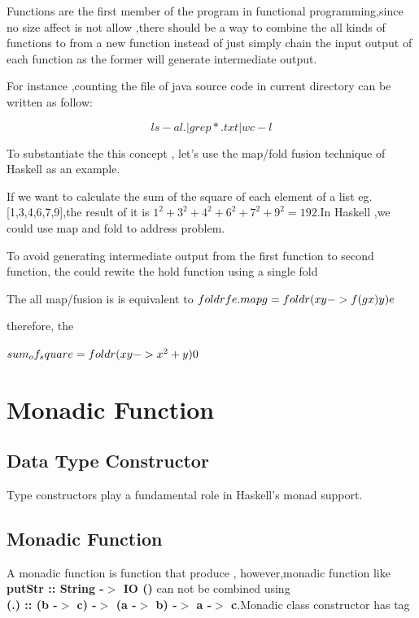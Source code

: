 Functions are the first member of the program in functional programming,since no size affect is not allow ,there should be a way to combine the all kinds of functions to from a new function instead of just simply chain the input output of each function as the former will generate intermediate output.


For instance ,counting the file of java source code in current directory can be written as follow:


	$$ ls-al . | grep *.txt| wc -l $$ 
	
	
To substantiate the this concept , let's use the map/fold fusion technique of Haskell as an example.

If we want to calculate the sum of the square of each element of a list eg. [1,3,4,6,7,9],the result of it is  $ 1^2+3^2+4^2+6^2+7^2+9^2=192 $.In Haskell ,we could use map and fold to address problem.


To avoid generating intermediate output from the first function to second function, the could rewite the hold function using a single fold

The all map/fusion is is equivalent to 
$ foldr f e . map g = foldr (\\x y -> f (g x) y) e $

therefore, the 

$ sum_of_square = foldr (\\x y -> x^2 + y) 0 $





\section{Monadic Function}
\subsection{Data Type Constructor}
Type constructors play a fundamental role in Haskell's monad support.
\subsection{Monadic Function}
A monadic function is function that produce , however,monadic function like \textbf{putStr :: String -$>$ IO ()} can not be combined using \\ \textbf{(.) :: (b -$>$ c) -$>$ (a -$>$ b) -$>$ a -$>$ c}.Monadic class constructor has tag 



